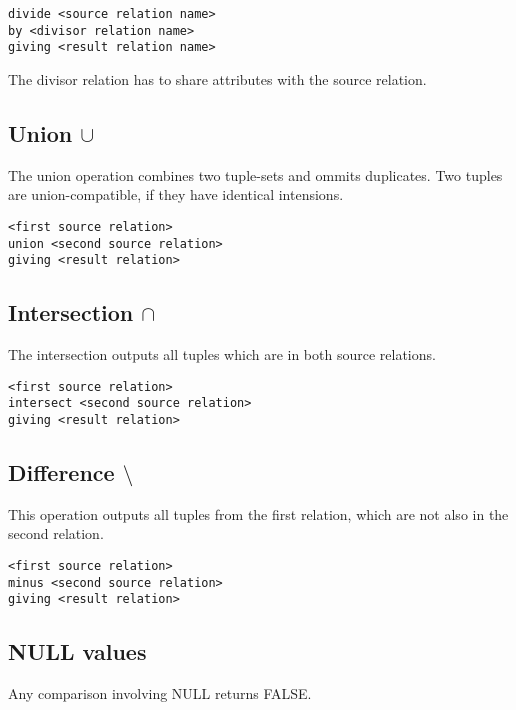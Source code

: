 \documentclass[a4paper,twocolumn]{article}
\begin{document}
\begin{verbatim}
divide <source relation name>
by <divisor relation name>
giving <result relation name>
\end{verbatim}

The divisor relation has to share attributes with the source relation.

\subsection{Union $\cup$}

The union operation combines two tuple-sets and ommits duplicates.
Two tuples are union-compatible, if they have identical
intensions.

\begin{verbatim}
<first source relation>
union <second source relation>
giving <result relation>
\end{verbatim}

\subsection{Intersection $\cap$}

The intersection outputs all tuples which are in both source relations.

\begin{verbatim}
<first source relation>
intersect <second source relation>
giving <result relation>
\end{verbatim}

\subsection{Difference $\setminus$}

This operation outputs all tuples from the first relation,
which are not also in the second relation.

\begin{verbatim}
<first source relation>
minus <second source relation>
giving <result relation>
\end{verbatim}

\subsection{NULL values}

Any comparison involving NULL returns FALSE.
\end{document}
